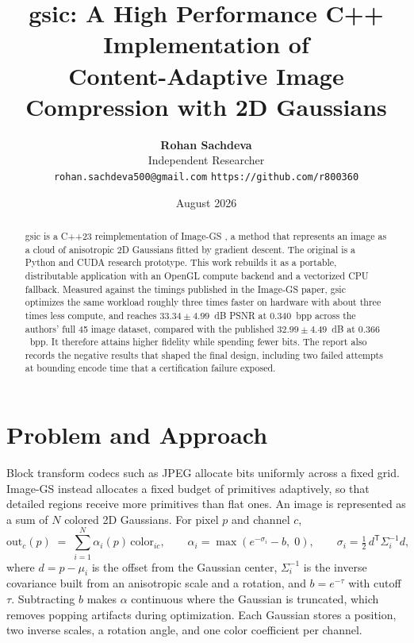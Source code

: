 \documentclass[11pt,a4paper]{article}
\title{\textbf{gsic: A High Performance C++ Implementation of\\
Content-Adaptive Image Compression with 2D Gaussians}}
\author{\textbf{Rohan Sachdeva} \\ Independent Researcher \\ \texttt{rohan.sachdeva500@gmail.com} \quad \texttt{https://github.com/r800360}}
\date{August 2026}
\begin{document}
\maketitle

\begin{abstract}
\noindent
gsic is a C++23 reimplementation of Image-GS \cite{imagegs}, a method that represents an image as a cloud of anisotropic 2D Gaussians fitted by gradient descent. The original is a Python and CUDA research prototype. This work rebuilds it as a portable, distributable application with an OpenGL compute backend and a vectorized CPU fallback. Measured against the timings published in the Image-GS paper, gsic optimizes the same workload roughly three times faster on hardware with about three times less compute, and reaches $33.34 \pm 4.99$~dB PSNR at $0.340$~bpp across the authors' full 45 image dataset, compared with the published $32.99 \pm 4.49$~dB at $0.366$~bpp. It therefore attains higher fidelity while spending fewer bits. The report also records the negative results that shaped the final design, including two failed attempts at bounding encode time that a certification failure exposed.
\end{abstract}

\newpage

\tableofcontents

\newpage

\section{Problem and Approach}

Block transform codecs such as JPEG allocate bits uniformly across a fixed grid. Image-GS instead allocates a fixed budget of primitives adaptively, so that detailed regions receive more primitives than flat ones. An image is represented as a sum of $N$ colored 2D Gaussians. For pixel $p$ and channel
$c$,
%
\begin{equation}
  \mathrm{out}_c(p) \;=\; \sum_{i=1}^{N} \alpha_i(p)\, \mathrm{color}_{ic},
  \qquad
  \alpha_i = \max\!\left(e^{-\sigma_i} - b,\; 0\right),
  \qquad
  \sigma_i = \tfrac{1}{2}\, d^{\mathsf T} \Sigma_i^{-1} d ,
  \label{eq:model}
\end{equation}
%
where $d = p - \mu_i$ is the offset from the Gaussian center, $\Sigma_i^{-1}$ is the inverse covariance built from an anisotropic scale and a rotation, and $b = e^{-\tau}$ with cutoff $\tau$. Subtracting $b$ makes $\alpha$ continuous
where the Gaussian is truncated, which removes popping artifacts during optimization. Each Gaussian stores a position, two inverse scales, a rotation
angle, and one color coefficient per channel.
\end{document}
